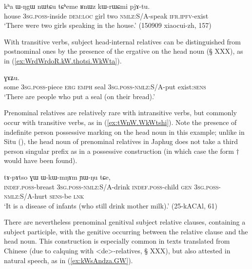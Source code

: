 \begin{exe}
\ex \label{ex:tCheme.RnWz.kWrWCmi}
 \gll  kʰa ɯ-ŋgɯ nɯtɕu tɕʰeme ʁnɯz kɯ-rɯɕmi pjɤ-tu. \\
 house \textsc{3sg}.\textsc{poss}-inside \textsc{dem}:\textsc{loc} girl two \textsc{nmlz}:S/A-speak \textsc{ifr}.\textsc{ipfv}-exist \\
\glt  `There were two girls speaking in the house.' (150909 xiaocui-zh, 157)
\end{exe}

With transitive verbs, subject head-internal relatives can be distinguished from postnominal ones  by the presence of the ergative  on the head noun (§ XXX), as in (\ref{ex:WrdWrdoR.kW.thotsi.WkWta}).

\begin{exe}
\ex \label{ex:WrdWrdoR.kW.thotsi.WkWta}
  ɣɤʑu. \\
 some \textsc{3sg}.\textsc{poss}-piece \textsc{erg} \textsc{emph} seal \textsc{3sg}.\textsc{poss}-\textsc{nmlz}:S/A-put exist:\textsc{sens} \\
 \glt `There are people who put a seal (on their bread).'
\end{exe}


Prenominal relatives are relatively rare with intransitive verbs, but commonly occur with transitive verbs, as in (\ref{ex:tWnW.WkWtshi}). Note the presence of indefinite person possessive marking on the head noun  in this example; unlike in Situ (\citealt{jacksonlin07}), the head noun of prenominal relatives in Japhug does not take a third person singular prefix as in a possessive construction (in which case the form $\dagger$ would have been found).

\begin{exe}
\ex \label{ex:tWnW.WkWtshi}
 \gll  [tɯ-nɯ ɯ-kɯ-tsʰi] tɤ-pɤtso ɣɯ ɯ-kɯ-mŋɤm ɲɯ-ŋu tɕe, \\
 \textsc{indef}.\textsc{poss}-breast \textsc{3sg}.\textsc{poss}-\textsc{nmlz}:S/A-drink \textsc{indef}.\textsc{poss}-child \textsc{gen} \textsc{3sg}.\textsc{poss}-\textsc{nmlz}:S/A-hurt \textsc{sens}-be \textsc{lnk} \\
 \glt `It is a disease of infants (who still drink mother milk).' (25-kACAl, 61)
\end{exe}

There are nevertheless prenominal genitival subject relative clauses, containing a subject participle, with the genitive  occurring between the relative clause and the head noun. This construction is especially common in texts translated from Chinese (due to calquing with  <de>-relatives, § XXX), but also attested in natural speech, as in (\ref{ex:kWsAndza.GW}).

